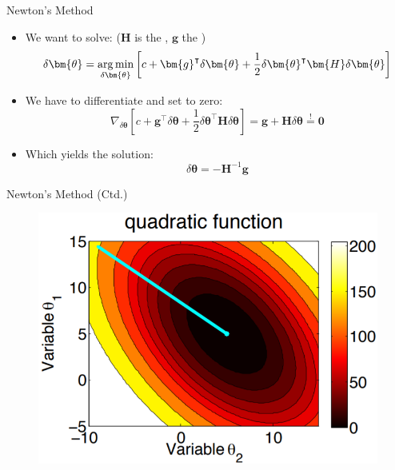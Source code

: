 \begin{frame}{Newton's Method}{}\optional
	\begin{itemize}
		\item We want to solve: {\footnotesize ($\bm{H}$ is the , $\bm{g}$ the )}
		\begin{equation}
			\delta \bm{\theta} = \argmin_{\delta \bm{\theta}}
				\left[ c + \bm{g}^{\intercal} \delta \bm{\theta} + \frac{1}{2} \delta \bm{\theta}^{\intercal} \bm{H} \delta \bm{\theta} \right]
		\end{equation}
		\item We have to differentiate and set to zero:
		\begin{equation}
			\nabla_{\delta \bm{\theta}} \left[ c + \bm{g}^{\intercal} \delta \bm{\theta} +
				\frac{1}{2} \delta \bm{\theta}^{\intercal} \bm{H} \delta \bm{\theta} \right]
				= \bm{g} + \bm{H} \delta \bm{\theta} \overset{!}{=} \bm{0}
		\end{equation}
		\item Which yields the solution:
		\begin{equation}
			\delta \bm{\theta} = -\bm{H}^{-1} \bm{g}
		\end{equation}
	\end{itemize}
\end{frame}


\begin{frame}{Newton's Method (Ctd.)}{}\optional
	\begin{figure}
		\centering
		\includegraphics[scale=0.4]{02_math/02_img/newton}
	\end{figure}
\end{frame}


